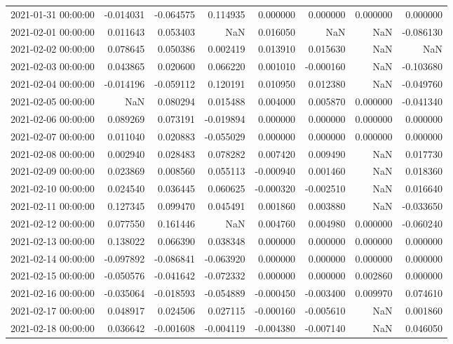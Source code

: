\begin{tabular}{lrrrrrrr}
2021-01-31 00:00:00 & -0.014031 & -0.064575 & 0.114935 & 0.000000 & 0.000000 & 0.000000 & 0.000000 \\
2021-02-01 00:00:00 & 0.011643 & 0.053403 & NaN & 0.016050 & NaN & NaN & -0.086130 \\
2021-02-02 00:00:00 & 0.078645 & 0.050386 & 0.002419 & 0.013910 & 0.015630 & NaN & NaN \\
2021-02-03 00:00:00 & 0.043865 & 0.020600 & 0.066220 & 0.001010 & -0.000160 & NaN & -0.103680 \\
2021-02-04 00:00:00 & -0.014196 & -0.059112 & 0.120191 & 0.010950 & 0.012380 & NaN & -0.049760 \\
2021-02-05 00:00:00 & NaN & 0.080294 & 0.015488 & 0.004000 & 0.005870 & 0.000000 & -0.041340 \\
2021-02-06 00:00:00 & 0.089269 & 0.073191 & -0.019894 & 0.000000 & 0.000000 & 0.000000 & 0.000000 \\
2021-02-07 00:00:00 & 0.011040 & 0.020883 & -0.055029 & 0.000000 & 0.000000 & 0.000000 & 0.000000 \\
2021-02-08 00:00:00 & 0.002940 & 0.028483 & 0.078282 & 0.007420 & 0.009490 & NaN & 0.017730 \\
2021-02-09 00:00:00 & 0.023869 & 0.008560 & 0.055113 & -0.000940 & 0.001460 & NaN & 0.018360 \\
2021-02-10 00:00:00 & 0.024540 & 0.036445 & 0.060625 & -0.000320 & -0.002510 & NaN & 0.016640 \\
2021-02-11 00:00:00 & 0.127345 & 0.099470 & 0.045491 & 0.001860 & 0.003880 & NaN & -0.033650 \\
2021-02-12 00:00:00 & 0.077550 & 0.161446 & NaN & 0.004760 & 0.004980 & 0.000000 & -0.060240 \\
2021-02-13 00:00:00 & 0.138022 & 0.066390 & 0.038348 & 0.000000 & 0.000000 & 0.000000 & 0.000000 \\
2021-02-14 00:00:00 & -0.097892 & -0.086841 & -0.063920 & 0.000000 & 0.000000 & 0.000000 & 0.000000 \\
2021-02-15 00:00:00 & -0.050576 & -0.041642 & -0.072332 & 0.000000 & 0.000000 & 0.002860 & 0.000000 \\
2021-02-16 00:00:00 & -0.035064 & -0.018593 & -0.054889 & -0.000450 & -0.003400 & 0.009970 & 0.074610 \\
2021-02-17 00:00:00 & 0.048917 & 0.024506 & 0.027115 & -0.000160 & -0.005610 & NaN & 0.001860 \\
2021-02-18 00:00:00 & 0.036642 & -0.001608 & -0.004119 & -0.004380 & -0.007140 & NaN & 0.046050 \\

\end{tabular}
